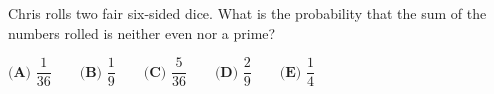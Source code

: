 Chris rolls two fair six-sided dice. What is the probability that the sum of the numbers rolled is neither even nor a prime?

$\textbf{(A) }\dfrac{1}{36}\qquad\textbf{(B) }\dfrac{1}{9}\qquad\textbf{(C) }\dfrac{5}{36}\qquad\textbf{(D) }\dfrac{2}{9}\qquad\textbf{(E) }\dfrac{1}{4}$
